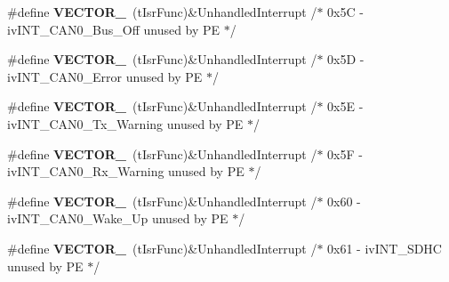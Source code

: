 \begin{DoxyCompactItemize}
\item 
\#define {\bfseries V\+E\+C\+T\+O\+R\+\_}~(t\+Isr\+Func)\&Unhandled\+Interrupt         /$\ast$ 0x5\+C -\/    iv\+I\+N\+T\+\_\+\+C\+A\+N0\+\_\+\+Bus\+\_\+\+Off             unused by P\+E $\ast$/\hypertarget{group___vectors___config__module_ga0fa099e76322546aafbf682962110cb3}{}\label{group___vectors___config__module_ga0fa099e76322546aafbf682962110cb3}

\item 
\#define {\bfseries V\+E\+C\+T\+O\+R\+\_}~(t\+Isr\+Func)\&Unhandled\+Interrupt         /$\ast$ 0x5\+D -\/    iv\+I\+N\+T\+\_\+\+C\+A\+N0\+\_\+\+Error               unused by P\+E $\ast$/\hypertarget{group___vectors___config__module_gaee335d0a7a9960bcb57ff11a5f535a9a}{}\label{group___vectors___config__module_gaee335d0a7a9960bcb57ff11a5f535a9a}

\item 
\#define {\bfseries V\+E\+C\+T\+O\+R\+\_}~(t\+Isr\+Func)\&Unhandled\+Interrupt         /$\ast$ 0x5\+E -\/    iv\+I\+N\+T\+\_\+\+C\+A\+N0\+\_\+\+Tx\+\_\+\+Warning          unused by P\+E $\ast$/\hypertarget{group___vectors___config__module_ga94fc2609b059951c2d9f0ca482cf36af}{}\label{group___vectors___config__module_ga94fc2609b059951c2d9f0ca482cf36af}

\item 
\#define {\bfseries V\+E\+C\+T\+O\+R\+\_}~(t\+Isr\+Func)\&Unhandled\+Interrupt         /$\ast$ 0x5\+F -\/    iv\+I\+N\+T\+\_\+\+C\+A\+N0\+\_\+\+Rx\+\_\+\+Warning          unused by P\+E $\ast$/\hypertarget{group___vectors___config__module_gadb53581b3b942110b4570a6bbd996005}{}\label{group___vectors___config__module_gadb53581b3b942110b4570a6bbd996005}

\item 
\#define {\bfseries V\+E\+C\+T\+O\+R\+\_}~(t\+Isr\+Func)\&Unhandled\+Interrupt         /$\ast$ 0x60 -\/    iv\+I\+N\+T\+\_\+\+C\+A\+N0\+\_\+\+Wake\+\_\+\+Up             unused by P\+E $\ast$/\hypertarget{group___vectors___config__module_ga8dc4f822ce77b78c9baf44596fb4e976}{}\label{group___vectors___config__module_ga8dc4f822ce77b78c9baf44596fb4e976}

\item 
\#define {\bfseries V\+E\+C\+T\+O\+R\+\_}~(t\+Isr\+Func)\&Unhandled\+Interrupt         /$\ast$ 0x61 -\/    iv\+I\+N\+T\+\_\+\+S\+D\+H\+C                     unused by P\+E $\ast$/\hypertarget{group___vectors___config__module_gacebf642612ec064d4e3acb28c3eb414d}{}\label{group___vectors___config__module_gacebf642612ec064d4e3acb28c3eb414d}


\end{DoxyCompactItemize}
